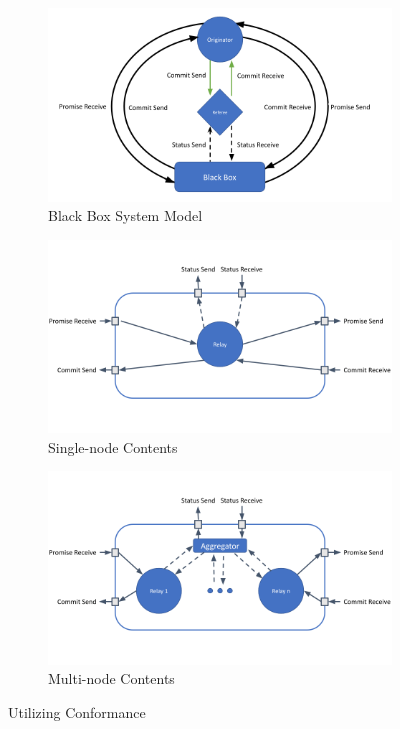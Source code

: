 \documentclass[runningheads]{llncs}
\begin{document}
\begin{figure}
     \centering
     \begin{subfigure}[b]{\textwidth}
         \centering
         \includegraphics[width=\textwidth]{paper/SystemBlackBoxModel.png}
         \caption{Black Box System Model}
         \label{fig:blackboxsystem}
     \end{subfigure}
     \hfill
     \begin{subfigure}[b]{0.4\textwidth}
         \centering
         \includegraphics[width=1.4\textwidth]{paper/SingleNodeBlackBox.png}
         \caption{Single-node Contents}
         \label{fig:singlenodebox}
     \end{subfigure}
     \hfill
     \begin{subfigure}[b]{0.4\textwidth}
         \centering
         \includegraphics[width=1.4\textwidth]{paper/MultiNodeBlackBox.png}
         \caption{Multi-node Contents}
        \label{fig:multinodebox}
     \end{subfigure}
        \caption{Utilizing Conformance}
         \label{fig:allblackbox}
\end{figure}
\end{document}
